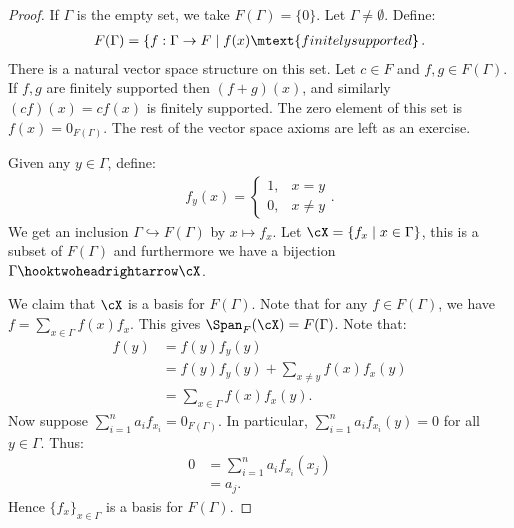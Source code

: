         \begin{proof}
            If $\Gamma$ is the empty set, we take $F(\Gamma) = \{0\}$. Let $\Gamma \neq \emptyset$. Define:
                \begin{equation*}
                \begin{split}
                    F(\Gamma) = \left\{f:\Gamma \rightarrow F \mid f(x)\mtext{finitely supported}\hspace{-5pt}\right\}.
                \end{split}
                \end{equation*}
            There is a natural vector space structure on this set. Let $c \in F$ and $f,g \in F(\Gamma)$. If $f,g$ are finitely supported then $(f+g)(x)$, and similarly $(cf)(x) = cf(x)$ is finitely supported. The zero element of this set is $f(x) = 0_{F(\Gamma)}$. The rest of the vector space axioms are left as an exercise.

            Given any $y \in \Gamma$, define:
                \begin{equation*}
                \begin{split}
                    f_y(x) = \begin{cases} 1, &x = y \\ 0, &x \neq y\end{cases}.
                \end{split}
                \end{equation*}
            We get an inclusion $\Gamma \hookrightarrow F(\Gamma)$ by $x \mapsto f_x$. Let $\cX = \{f_x \mid x \in \Gamma\}$, this is a subset of $F(\Gamma)$ and furthermore we have a bijection $\Gamma \hooktwoheadrightarrow \cX$.

            We claim that $\cX$ is a basis for $F(\Gamma)$. Note that for any $f \in F(\Gamma)$, {\color{red} we have $f = \sum_{x \in \Gamma}f(x)f_x$. This gives $\Span_F(\cX) = F(\Gamma)$.} Note that:
                \begin{equation*}
                \begin{split}
                    f(y)
                    & = f(y)f_y(y) \\
                    & = f(y)f_y(y) + \sum_{x \neq y}f(x)f_x(y) \\
                    & = \sum_{x \in \Gamma}f(x)f_x(y).
                \end{split}
                \end{equation*}
            Now suppose $\sum_{i = 1}^n a_if_{x_i} = 0_{F(\Gamma)}$. In particular, $\sum_{i = 1}^n a_if_{x_i}(y) = 0$ for all $y \in \Gamma$. Thus:
                \begin{equation*}
                \begin{split}
                    0 
                    &= \sum_{i=1}^n a_i f_{x_i}(x_j) \\
                    & = a_j.
                \end{split}
                \end{equation*}
            Hence $\{f_x\}_{x \in \Gamma}$ is a basis for $F(\Gamma)$.


\end{proof}
